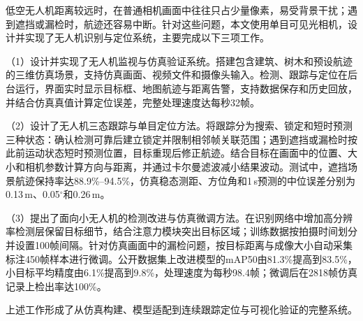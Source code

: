 \begin{ChineseAbstract}

低空无人机距离较远时，在普通相机画面中往往只占少量像素，易受背景干扰；遇到遮挡或漏检时，航迹还容易中断。针对这些问题，本文使用单目可见光相机，设计并实现了无人机识别与定位系统，主要完成以下三项工作。

（1）设计并实现了无人机监视与仿真验证系统。搭建包含建筑、树木和预设航迹的三维仿真场景，支持仿真画面、视频文件和摄像头输入。检测、跟踪与定位在后台运行，界面实时显示目标框、地图航迹与距离告警，支持数据保存和历史回放，并结合仿真真值计算定位误差，完整处理速度达每秒32帧。

（2）设计了无人机三态跟踪与单目定位方法。将跟踪分为搜索、锁定和短时预测三种状态：确认检测可靠后建立锁定并限制相邻帧关联范围；遇到遮挡或漏检时按此前运动状态短时预测位置，目标重现后修正航迹。结合目标在画面中的位置、大小和相机参数计算方向与距离，并通过卡尔曼滤波减小结果波动。测试中，遮挡场景航迹保持率达88.9\%--94.5\%，仿真稳态测距、方位角和1\,s预测的中位误差分别为0.13\,m、0.05$^{\circ}$和0.26\,m。

（3）提出了面向小无人机的检测改进与仿真微调方法。在识别网络中增加高分辨率检测层保留目标细节，结合注意力模块突出目标区域；训练数据按拍摄时间划分并设置100帧间隔。针对仿真画面中的漏检问题，按目标距离与成像大小自动采集标注450帧样本进行微调。公开数据集上改进模型的mAP50由81.3\%提高到83.5\%，小目标平均精度由6.1\%提高到9.8\%，处理速度为每秒98.4帧；微调后在2818帧仿真记录上检出率达100\%。

上述工作形成了从仿真构建、模型适配到连续跟踪定位与可视化验证的完整系统。


\end{ChineseAbstract}

